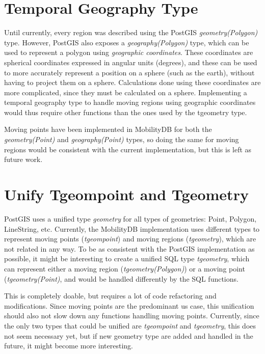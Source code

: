 
\section{Temporal Geography Type}
\label{section:tgeography}

Until currently, every region was described using the PostGIS \textit{geometry(Polygon)} type. However, PostGIS also exposes a \textit{geography(Polygon)} type, which can be used to represent a polygon using \textit{geographic coordinates}. These coordinates are spherical coordinates expressed in angular units (degrees), and these can be used to more accurately represent a position on a sphere (such as the earth), without having to project them on a sphere. Calculations done using these coordinates are more complicated, since they must be calculated on a sphere. Implementing a temporal geography type to handle moving regions using geographic coordinates would thus require other functions than the ones used by the tgeometry type. 

Moving points have been implemented in MobilityDB for both the \textit{geometry(Point)} and \textit{geography(Point)} types, so doing the same for moving regions would be consistent with the current implementation, but this is left as future work.

\section{Unify Tgeompoint and Tgeometry}
\label{section:tgeompoint}

PostGIS uses a unified type \textit{geometry} for all types of geometries: Point, Polygon, LineString, etc. Currently, the MobilityDB implementation uses different types to represent moving points (\textit{tgeompoint}) and moving regions (\textit{tgeometry}), which are not related in any way. To be as consistent with the PostGIS implementation as possible, it might be interesting to create a unified SQL type \textit{tgeometry}, which can represent either a moving region (\textit{tgeometry(Polygon)}) or a moving point (\textit{tgeometry(Point)}, and would be handled differently by the SQL functions.

This is completely doable, but requires a lot of code refactoring and modifications. Since moving points are the predominant us case, this unification should also not slow down any functions handling moving points. Currently, since the only two types that could be unified are \textit{tgeompoint} and \textit{tgeometry}, this does not seem necessary yet, but if new geometry type are added and handled in the future, it might become more interesting.